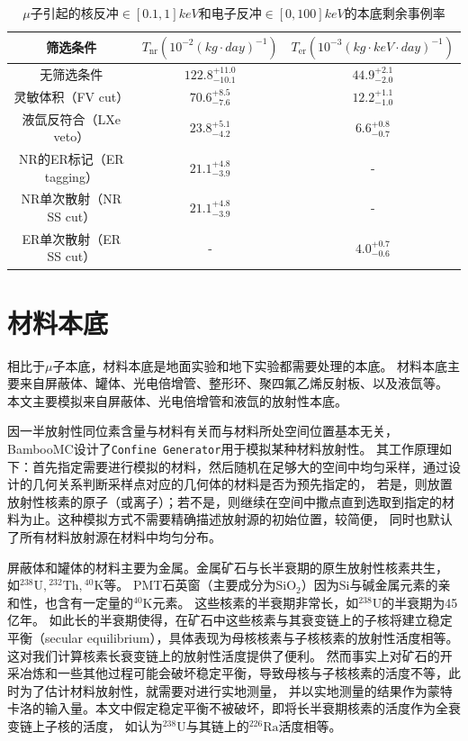 \begin{table}
  \centering
  \caption{$\mu$子引起的核反冲$\in[0.1,1]\si{keV}$和电子反冲$\in[0,100]\si{keV}$的本底剩余事例率}
  \begin{tabular}{ccc}
    \toprule
    筛选条件 & $T_\mathrm{nr}\left(10^{-2}\left(\si{kg}\cdot\si{day}\right)^{-1}\right)$ & $T_\mathrm{er}\left(10^{-3}\left(\si{kg}\cdot\si{keV}\cdot\si{day}\right)^{-1}\right)$ \\
    \midrule
    无筛选条件 & $122.8_{-10.1}^{+11.0}$ & $44.9_{-2.0}^{+2.1}$ \\
    灵敏体积（FV cut） & $70.6_{-7.6}^{+8.5}$ & $12.2_{-1.0}^{+1.1}$ \\
    液氙反符合（LXe veto） & $23.8_{-4.2}^{+5.1}$ & $6.6_{-0.7}^{+0.8}$ \\
    NR的ER标记（ER tagging） & $21.1_{-3.9}^{+4.8}$ & - \\
    NR单次散射（NR SS cut） & $21.1_{-3.9}^{+4.8}$ & - \\
    ER单次散射（ER SS cut） & - & $4.0_{-0.6}^{+0.7}$ \\
    \bottomrule
  \end{tabular}
  \label{tab:cuts_muon_remain}
\end{table}

\section{材料本底}

相比于$\mu$子本底，材料本底是地面实验和地下实验都需要处理的本底。
材料本底主要来自屏蔽体、罐体、光电倍增管、整形环、聚四氟乙烯反射板、以及液氙等。
本文主要模拟来自屏蔽体、光电倍增管和液氙的放射性本底。

因一半放射性同位素含量与材料有关而与材料所处空间位置基本无关，BambooMC设计了\verb|Confine Generator|用于模拟某种材料放射性。
其工作原理如下：首先指定需要进行模拟的材料，然后随机在足够大的空间中均匀采样，通过设计的几何关系判断采样点对应的几何体的材料是否为预先指定的，
若是，则放置放射性核素的原子（或离子）；若不是，则继续在空间中撒点直到选取到指定的材料为止。这种模拟方式不需要精确描述放射源的初始位置，较简便，
同时也默认了所有材料放射源在材料中均匀分布。

屏蔽体和罐体的材料主要为金属。金属矿石与长半衰期的原生放射性核素共生，
如${}^{238}\mathrm{U},{}^{232}\mathrm{Th},{}^{40}\mathrm{K}$等。
PMT石英窗（主要成分为$\mathrm{Si}\mathrm{O}_2$）因为$\mathrm{Si}$与碱金属元素的亲和性，也含有一定量的${}^{40}\mathrm{K}$元素。
这些核素的半衰期非常长，如${}^{238}\mathrm{U}$的半衰期为45亿年。
如此长的半衰期使得，在矿石中这些核素与其衰变链上的子核将建立稳定平衡（secular equilibrium），具体表现为母核核素与子核核素的放射性活度相等。
这对我们计算核素长衰变链上的放射性活度提供了便利。
然而事实上对矿石的开采冶炼和一些其他过程可能会破坏稳定平衡，导致母核与子核核素的活度不等，此时为了估计材料放射性，就需要对进行实地测量，
并以实地测量的结果作为蒙特卡洛的输入量。本文中假定稳定平衡不被破坏，即将长半衰期核素的活度作为全衰变链上子核的活度，
如认为${}^{238}\mathrm{U}$与其链上的${}^{226}\mathrm{Ra}$活度相等。

